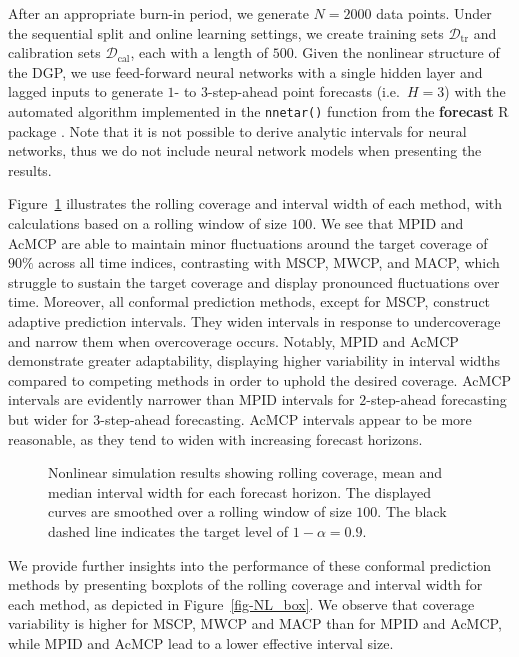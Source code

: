 \documentclass[
  11pt,
  a4paper,
]{article}
\theoremstyle{plain}
\theoremstyle{remark}
\begin{document}
After an appropriate burn-in period, we generate \(N=2000\) data points.
Under the sequential split and online learning settings, we create
training sets \(\mathcal{D}_{\text{tr}}\) and calibration sets
\(\mathcal{D}_{\text{cal}}\), each with a length of \(500\). Given the
nonlinear structure of the DGP, we use feed-forward neural networks with
a single hidden layer and lagged inputs to generate \(1\)- to
\(3\)-step-ahead point forecasts (i.e.~\(H=3\)) with the automated
algorithm implemented in the \texttt{nnetar()} function from the
\textbf{forecast} R package \autocite{hyndman2024}. Note that it is not
possible to derive analytic intervals for neural networks, thus we do
not include neural network models when presenting the results.

Figure~\ref{fig-NL_cov} illustrates the rolling coverage and interval
width of each method, with calculations based on a rolling window of
size \(100\). We see that MPID and AcMCP are able to maintain minor
fluctuations around the target coverage of \(90\%\) across all time
indices, contrasting with MSCP, MWCP, and MACP, which struggle to
sustain the target coverage and display pronounced fluctuations over
time. Moreover, all conformal prediction methods, except for MSCP,
construct adaptive prediction intervals. They widen intervals in
response to undercoverage and narrow them when overcoverage occurs.
Notably, MPID and AcMCP demonstrate greater adaptability, displaying
higher variability in interval widths compared to competing methods in
order to uphold the desired coverage. AcMCP intervals are evidently
narrower than MPID intervals for \(2\)-step-ahead forecasting but wider
for \(3\)-step-ahead forecasting. AcMCP intervals appear to be more
reasonable, as they tend to widen with increasing forecast horizons.

\begin{figure}


\caption{\label{fig-NL_cov}Nonlinear simulation results showing rolling
coverage, mean and median interval width for each forecast horizon. The
displayed curves are smoothed over a rolling window of size \(100\). The
black dashed line indicates the target level of \(1-\alpha=0.9\).}

\end{figure}%

We provide further insights into the performance of these conformal
prediction methods by presenting boxplots of the rolling coverage and
interval width for each method, as depicted in Figure~\ref{fig-NL_box}.
We observe that coverage variability is higher for MSCP, MWCP and MACP
than for MPID and AcMCP, while MPID and AcMCP lead to a lower effective
interval size.
\end{document}
